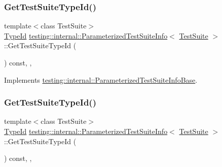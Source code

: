 \subsubsection{\texorpdfstring{GetTestSuiteTypeId()}{GetTestSuiteTypeId()}\hspace{0.1cm}{\footnotesize\ttfamily [1/2]}}
{\footnotesize\ttfamily template$<$class Test\+Suite$>$ \\
\mbox{\hyperlink{namespacetesting_1_1internal_a38c435cbab5f8b784e2e7f3356cab242}{Type\+Id}} \mbox{\hyperlink{classtesting_1_1internal_1_1_parameterized_test_suite_info}{testing\+::internal\+::\+Parameterized\+Test\+Suite\+Info}}$<$ \mbox{\hyperlink{classtesting_1_1_test_suite}{Test\+Suite}} $>$\+::Get\+Test\+Suite\+Type\+Id (\begin{DoxyParamCaption}{ }\end{DoxyParamCaption}) const\hspace{0.3cm}{\ttfamily [inline]}, {\ttfamily [override]}, {\ttfamily [virtual]}}



Implements \mbox{\hyperlink{classtesting_1_1internal_1_1_parameterized_test_suite_info_base_ac5bcbf8c50a44472d697e0c80b54387d}{testing\+::internal\+::\+Parameterized\+Test\+Suite\+Info\+Base}}.

\mbox{\label{classtesting_1_1internal_1_1_parameterized_test_suite_info_af488d1d7c1889a250acff2ea6eba4c84}} 
\subsubsection{\texorpdfstring{GetTestSuiteTypeId()}{GetTestSuiteTypeId()}\hspace{0.1cm}{\footnotesize\ttfamily [2/2]}}
{\footnotesize\ttfamily template$<$class Test\+Suite$>$ \\
\mbox{\hyperlink{namespacetesting_1_1internal_a38c435cbab5f8b784e2e7f3356cab242}{Type\+Id}} \mbox{\hyperlink{classtesting_1_1internal_1_1_parameterized_test_suite_info}{testing\+::internal\+::\+Parameterized\+Test\+Suite\+Info}}$<$ \mbox{\hyperlink{classtesting_1_1_test_suite}{Test\+Suite}} $>$\+::Get\+Test\+Suite\+Type\+Id (\begin{DoxyParamCaption}{ }\end{DoxyParamCaption}) const\hspace{0.3cm}{\ttfamily [inline]}, {\ttfamily [override]}, {\ttfamily [virtual]}}



